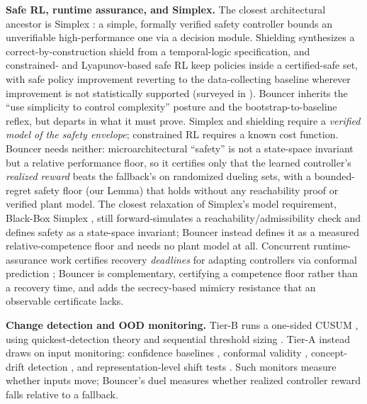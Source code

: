 \textbf{Safe RL, runtime assurance, and Simplex.} The closest architectural ancestor is Simplex \citep{sha2001simplicity}: a simple, formally verified safety controller bounds an unverifiable high-performance one via a decision module. Shielding \citep{alshiekh2018shielding} synthesizes a correct-by-construction shield from a temporal-logic specification, and constrained- and Lyapunov-based safe RL \citep{altman1999cmdp, achiam2017cpo, chow2018lyapunov, berkenkamp2017stability} keep policies inside a certified-safe set, with safe policy improvement \citep{thomas2015hcpi, laroche2019spibb} reverting to the data-collecting baseline wherever improvement is not statistically supported (surveyed in \citep{garcia2015survey}). Bouncer inherits the ``use simplicity to control complexity'' posture and the bootstrap-to-baseline reflex, but departs in what it must prove. Simplex and shielding require a \emph{verified model of the safety envelope}; constrained RL requires a known cost function. Bouncer needs neither: microarchitectural ``safety'' is not a state-space invariant but a relative performance floor, so it certifies only that the learned controller's \emph{realized reward} beats the fallback's on randomized dueling sets, with a bounded-regret safety floor (our Lemma) that holds without any reachability proof or verified plant model. The closest relaxation of Simplex's model requirement, Black-Box Simplex \citep{mehmood2022blackbox}, still forward-simulates a reachability/admissibility check and defines safety as a state-space invariant; Bouncer instead defines it as a measured relative-competence floor and needs no plant model at all. Concurrent runtime-assurance work certifies recovery \emph{deadlines} for adapting controllers via conformal prediction \citep{shojaei2026conformal}; Bouncer is complementary, certifying a competence floor rather than a recovery time, and adds the secrecy-based mimicry resistance that an observable certificate lacks.

\textbf{Change detection and OOD monitoring.} Tier-B runs a one-sided CUSUM
\citep{page1954cusum}, using quickest-detection theory
\citep{lorden1971reacting,moustakides1986optimal} and sequential threshold sizing
\citep{siegmund1985sequential,tartakovsky2014sequential}. Tier-A instead draws on
input monitoring: confidence baselines \citep{hendrycks2017baseline}, conformal
validity \citep{vovk2005algorithmic,lei2018distribution}, concept-drift detection
\citep{gama2014survey}, and representation-level shift tests
\citep{rabanser2019failing}. Such monitors measure whether inputs move; Bouncer's
duel measures whether realized controller reward falls relative to a fallback.

